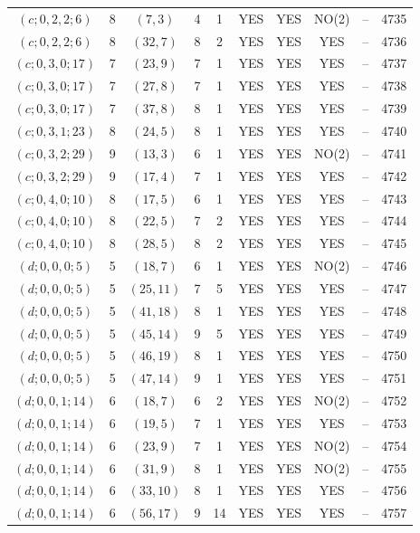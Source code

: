 \begin{longtable}{|c|c|c|c|c|c|c|c|c|c|}
$(c; 0, 2, 2; 6)$ & 8 & $(7, 3)$ & 4 & 1 & YES & YES & NO(2) & -- & 4735\\
$(c; 0, 2, 2; 6)$ & 8 & $(32, 7)$ & 8 & 2 & YES & YES & YES & -- & 4736\\
$(c; 0, 3, 0; 17)$ & 7 & $(23, 9)$ & 7 & 1 & YES & YES & YES & -- & 4737\\
$(c; 0, 3, 0; 17)$ & 7 & $(27, 8)$ & 7 & 1 & YES & YES & YES & -- & 4738\\
$(c; 0, 3, 0; 17)$ & 7 & $(37, 8)$ & 8 & 1 & YES & YES & YES & -- & 4739\\
$(c; 0, 3, 1; 23)$ & 8 & $(24, 5)$ & 8 & 1 & YES & YES & YES & -- & 4740\\
$(c; 0, 3, 2; 29)$ & 9 & $(13, 3)$ & 6 & 1 & YES & YES & NO(2) & -- & 4741\\
$(c; 0, 3, 2; 29)$ & 9 & $(17, 4)$ & 7 & 1 & YES & YES & YES & -- & 4742\\
$(c; 0, 4, 0; 10)$ & 8 & $(17, 5)$ & 6 & 1 & YES & YES & YES & -- & 4743\\
$(c; 0, 4, 0; 10)$ & 8 & $(22, 5)$ & 7 & 2 & YES & YES & YES & -- & 4744\\
$(c; 0, 4, 0; 10)$ & 8 & $(28, 5)$ & 8 & 2 & YES & YES & YES & -- & 4745\\
$(d; 0, 0, 0; 5)$ & 5 & $(18, 7)$ & 6 & 1 & YES & YES & NO(2) & -- & 4746\\
$(d; 0, 0, 0; 5)$ & 5 & $(25, 11)$ & 7 & 5 & YES & YES & YES & -- & 4747\\
$(d; 0, 0, 0; 5)$ & 5 & $(41, 18)$ & 8 & 1 & YES & YES & YES & -- & 4748\\
$(d; 0, 0, 0; 5)$ & 5 & $(45, 14)$ & 9 & 5 & YES & YES & YES & -- & 4749\\
$(d; 0, 0, 0; 5)$ & 5 & $(46, 19)$ & 8 & 1 & YES & YES & YES & -- & 4750\\
$(d; 0, 0, 0; 5)$ & 5 & $(47, 14)$ & 9 & 1 & YES & YES & YES & -- & 4751\\
$(d; 0, 0, 1; 14)$ & 6 & $(18, 7)$ & 6 & 2 & YES & YES & NO(2) & -- & 4752\\
$(d; 0, 0, 1; 14)$ & 6 & $(19, 5)$ & 7 & 1 & YES & YES & YES & -- & 4753\\
$(d; 0, 0, 1; 14)$ & 6 & $(23, 9)$ & 7 & 1 & YES & YES & NO(2) & -- & 4754\\
$(d; 0, 0, 1; 14)$ & 6 & $(31, 9)$ & 8 & 1 & YES & YES & NO(2) & -- & 4755\\
$(d; 0, 0, 1; 14)$ & 6 & $(33, 10)$ & 8 & 1 & YES & YES & YES & -- & 4756\\
$(d; 0, 0, 1; 14)$ & 6 & $(56, 17)$ & 9 & 14 & YES & YES & YES & -- & 4757\\

\end{longtable}
